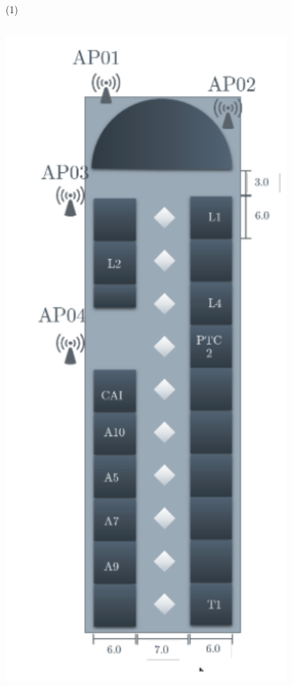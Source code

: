 \begin{frame}{ \footnotemark (1)}
\begin{columns}
\begin{column}{0.2\textwidth}  
    \begin{center}
     \includegraphics[width=0.8\textwidth]{Figs/IndoorPositionSystem1}
     \end{center}
\end{column}
\end{columns}
\setcounter{footnote}{0}
\end{frame}

